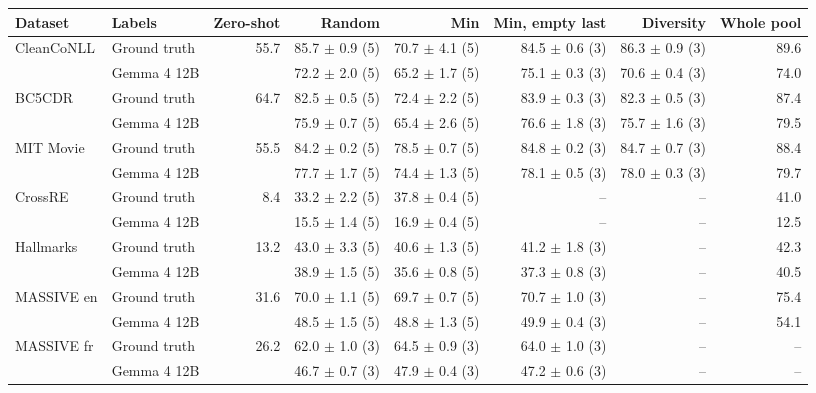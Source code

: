 \begin{tabular}{llrrrrrr}
\toprule
Dataset & Labels & Zero-shot & Random & Min & Min, empty last & Diversity & Whole pool \\
\midrule
CleanCoNLL & Ground truth & 55.7 & 85.7 $\pm$ 0.9 (5) & 70.7 $\pm$ 4.1 (5) & 84.5 $\pm$ 0.6 (3) & 86.3 $\pm$ 0.9 (3) & 89.6 \\
 & Gemma 4 12B &  & 72.2 $\pm$ 2.0 (5) & 65.2 $\pm$ 1.7 (5) & 75.1 $\pm$ 0.3 (3) & 70.6 $\pm$ 0.4 (3) & 74.0 \\
BC5CDR & Ground truth & 64.7 & 82.5 $\pm$ 0.5 (5) & 72.4 $\pm$ 2.2 (5) & 83.9 $\pm$ 0.3 (3) & 82.3 $\pm$ 0.5 (3) & 87.4 \\
 & Gemma 4 12B &  & 75.9 $\pm$ 0.7 (5) & 65.4 $\pm$ 2.6 (5) & 76.6 $\pm$ 1.8 (3) & 75.7 $\pm$ 1.6 (3) & 79.5 \\
MIT Movie & Ground truth & 55.5 & 84.2 $\pm$ 0.2 (5) & 78.5 $\pm$ 0.7 (5) & 84.8 $\pm$ 0.2 (3) & 84.7 $\pm$ 0.7 (3) & 88.4 \\
 & Gemma 4 12B &  & 77.7 $\pm$ 1.7 (5) & 74.4 $\pm$ 1.3 (5) & 78.1 $\pm$ 0.5 (3) & 78.0 $\pm$ 0.3 (3) & 79.7 \\
CrossRE & Ground truth & 8.4 & 33.2 $\pm$ 2.2 (5) & 37.8 $\pm$ 0.4 (5) & -- & -- & 41.0 \\
 & Gemma 4 12B &  & 15.5 $\pm$ 1.4 (5) & 16.9 $\pm$ 0.4 (5) & -- & -- & 12.5 \\
Hallmarks & Ground truth & 13.2 & 43.0 $\pm$ 3.3 (5) & 40.6 $\pm$ 1.3 (5) & 41.2 $\pm$ 1.8 (3) & -- & 42.3 \\
 & Gemma 4 12B &  & 38.9 $\pm$ 1.5 (5) & 35.6 $\pm$ 0.8 (5) & 37.3 $\pm$ 0.8 (3) & -- & 40.5 \\
MASSIVE en & Ground truth & 31.6 & 70.0 $\pm$ 1.1 (5) & 69.7 $\pm$ 0.7 (5) & 70.7 $\pm$ 1.0 (3) & -- & 75.4 \\
 & Gemma 4 12B &  & 48.5 $\pm$ 1.5 (5) & 48.8 $\pm$ 1.3 (5) & 49.9 $\pm$ 0.4 (3) & -- & 54.1 \\
MASSIVE fr & Ground truth & 26.2 & 62.0 $\pm$ 1.0 (3) & 64.5 $\pm$ 0.9 (3) & 64.0 $\pm$ 1.0 (3) & -- & -- \\
 & Gemma 4 12B &  & 46.7 $\pm$ 0.7 (3) & 47.9 $\pm$ 0.4 (3) & 47.2 $\pm$ 0.6 (3) & -- & -- \\
\bottomrule
\end{tabular}
